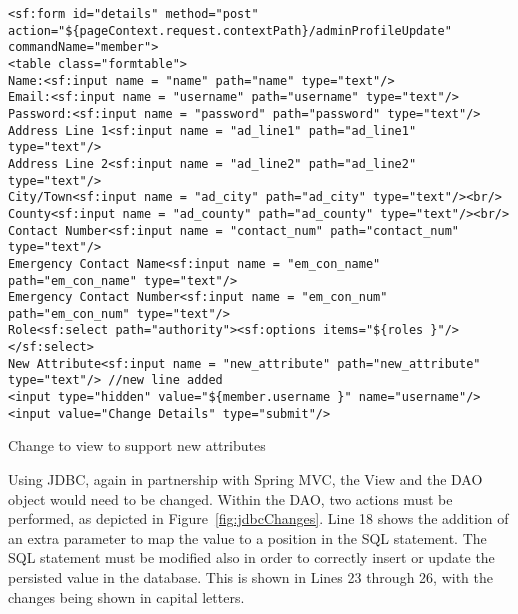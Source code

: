 \begin{table}[H]
\begin{lstlisting}
<sf:form id="details" method="post" action="${pageContext.request.contextPath}/adminProfileUpdate" commandName="member">
<table class="formtable">
Name:<sf:input name = "name" path="name" type="text"/>
Email:<sf:input name = "username" path="username" type="text"/>
Password:<sf:input name = "password" path="password" type="text"/>
Address Line 1<sf:input name = "ad_line1" path="ad_line1" type="text"/>
Address Line 2<sf:input name = "ad_line2" path="ad_line2" type="text"/>
City/Town<sf:input name = "ad_city" path="ad_city" type="text"/><br/>
County<sf:input name = "ad_county" path="ad_county" type="text"/><br/>
Contact Number<sf:input name = "contact_num" path="contact_num" type="text"/>
Emergency Contact Name<sf:input name = "em_con_name" path="em_con_name" type="text"/>
Emergency Contact Number<sf:input name = "em_con_num" path="em_con_num" type="text"/>
Role<sf:select path="authority"><sf:options items="${roles }"/></sf:select>
New Attribute<sf:input name = "new_attribute" path="new_attribute" type="text"/> //new line added
<input type="hidden" value="${member.username }" name="username"/>
<input value="Change Details" type="submit"/>
\end{lstlisting}
\caption{Change to view to support new attributes}
\label{fig:viewChange}
\end{table}
Using JDBC, again in partnership with Spring MVC, the View and the DAO object would need to be changed. Within the DAO, two actions must be performed, as depicted in Figure~\ref{fig:jdbcChanges}. Line 18 shows the addition of an extra parameter to map the value to a position in the SQL statement. The SQL statement must be modified also in order to correctly insert or update the persisted value in the database. This is shown in Lines 23 through 26, with the changes being shown in capital letters. 

